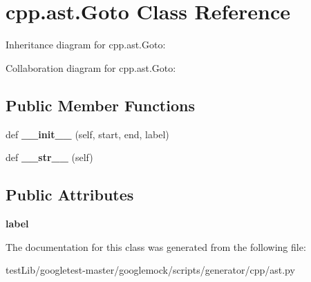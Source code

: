 \hypertarget{classcpp_1_1ast_1_1Goto}{}\section{cpp.\+ast.\+Goto Class Reference}
\label{classcpp_1_1ast_1_1Goto}


Inheritance diagram for cpp.\+ast.\+Goto\+:


Collaboration diagram for cpp.\+ast.\+Goto\+:
\subsection*{Public Member Functions}
\begin{DoxyCompactItemize}
\item 
\mbox{\label{classcpp_1_1ast_1_1Goto_a928e79374a90d01fc060985ea1e45260}} 
def {\bfseries \+\_\+\+\_\+init\+\_\+\+\_\+} (self, start, end, label)
\item 
\mbox{\label{classcpp_1_1ast_1_1Goto_a508b6bc091cf06bfed73a33368c236c9}} 
def {\bfseries \+\_\+\+\_\+str\+\_\+\+\_\+} (self)
\end{DoxyCompactItemize}
\subsection*{Public Attributes}
\begin{DoxyCompactItemize}
\item 
\mbox{\label{classcpp_1_1ast_1_1Goto_a685284ea5f3b21f39aff7f5db841c8f5}} 
{\bfseries label}
\end{DoxyCompactItemize}


The documentation for this class was generated from the following file\+:\begin{DoxyCompactItemize}
\item 
test\+Lib/googletest-\/master/googlemock/scripts/generator/cpp/ast.\+py\end{DoxyCompactItemize}
